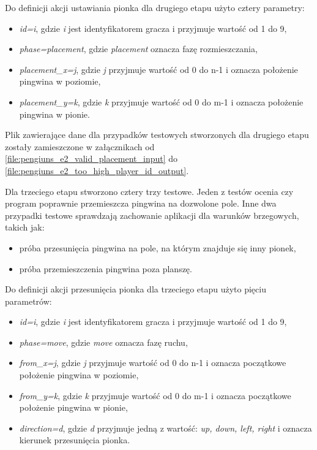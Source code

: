 Do definicji akcji ustawiania pionka dla drugiego etapu użyto cztery parametry:
\begin{itemize}
    \item \textit{id=i}, gdzie \textit{i} jest identyfikatorem gracza i przyjmuje wartość od 1 do 9,
    \item \textit{phase=placement}, gdzie \textit{placement} oznacza fazę rozmieszczania,
    \item \textit{placement\_x=j}, gdzie \textit{j} przyjmuje wartość od 0 do n-1 i oznacza położenie pingwina w poziomie,
    \item \textit{placement\_y=k}, gdzie \textit{k} przyjmuje wartość od 0 do m-1 i oznacza położenie pingwina w pionie.
\end{itemize}

Plik zawierające dane dla przypadków testowych stworzonych dla drugiego etapu zostały zamieszczone w załącznikach od \ref{file:pengiuns_e2_valid_placement_input} do \ref{file:pengiuns_e2_too_high_player_id_output}.


Dla trzeciego etapu stworzono cztery trzy testowe.
Jeden z testów ocenia czy program poprawnie przemieszcza pingwina na dozwolone pole.
Inne dwa przypadki testowe sprawdzają zachowanie aplikacji dla warunków brzegowych, takich jak:
\begin{itemize}
    \item próba przesunięcia pingwina na pole, na którym znajduje się inny pionek,
    \item próba przemieszczenia pingwina poza planszę.
\end{itemize}

Do definicji akcji przesunięcia pionka dla trzeciego etapu użyto pięciu parametrów:
\begin{itemize}
    \item \textit{id=i}, gdzie \textit{i} jest identyfikatorem gracza i przyjmuje wartość od 1 do 9,
    \item \textit{phase=move}, gdzie \textit{move} oznacza fazę ruchu,
    \item \textit{from\_x=j}, gdzie \textit{j} przyjmuje wartość od 0 do n-1 i oznacza początkowe położenie pingwina w poziomie,
    \item \textit{from\_y=k}, gdzie \textit{k} przyjmuje wartość od 0 do m-1 i oznacza początkowe położenie pingwina w pionie,
    \item \textit{direction=d}, gdzie \textit{d} przyjmuje jedną z wartość: \textit{up, down, left, right} i oznacza kierunek przesunięcia pionka.
\end{itemize}

